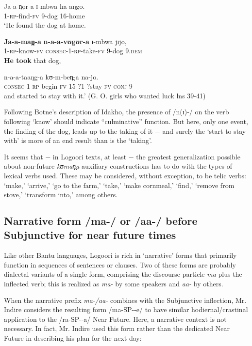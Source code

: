 \documentclass[output=paper]{langsci/langscibook}
\begin{document}
\ea\label{ex:sarvasy:27}
\gll Ja-a-n̪or-a   ɪ-mbwa   ha-aŋgo. \\
1-\textsc{rp}-find-\textsc{fv}  9-dog    16-home \\
\glt ‘He found the dog at home.

\gll \textbf{Ja-a-man̪-a}   \textbf{n-a-a-vʊgʊr-a}     ɪ-mbwa   jɪjo, \\
1-\textsc{rp}-know-\textsc{fv}  \textsc{consec}-1-\textsc{rp}-take-\textsc{fv}  9-dog    9.\textsc{dem} \\
\glt \textbf{He took} that dog,

\gll n-a-a-taaŋg-a       kʊ-m-ben̪-a     na-jo. \\
\textsc{consec}-1-\textsc{rp}-begin-\textsc{fv}  15-?1-?stay-\textsc{fv}  \textsc{conj}-9 \\
\glt and started to stay with it.’ (G. O. girls who wanted luck lns 39-41)
\z 

Following Botne’s description of Idakho, the presence of /n(ɪ)-/ on the verb following ‘know’ should indicate “culminative” function. But here, only one event, the finding of the dog, leads up to the taking of it $-$ and surely the ‘start to stay with’ is more of an end result than is the ‘taking’.

It seems that $-$ in Logoori texts, at least $-$ the greatest generalization possible about non-future \textit{kʊman̪a} auxiliary constructions has to do with the types of lexical verbs used. These may be considered, without exception, to be telic verbs: ‘make,’ ‘arrive,’ ‘go to the farm,’ ‘take,’ ‘make cornmeal,’ ‘find,’ ‘remove from stove,’ ‘transform into,’ among others.

\subsection{Narrative form /ma-/ or /aa-/ before Subjunctive for near future times} \label{sec:sarvasy:7.4}

Like other Bantu languages, Logoori is rich in ‘narrative’ %
%
forms that primarily function in sequences of sentences or clauses. Two of these forms are probably dialectal variants of a single form, comprising the discourse particle \textit{ma} plus the inflected verb; this is realized as \textit{ma-} by some speakers and \textit{aa-} by others.

When the narrative prefix \textit{ma-/aa-} combines with the Subjunctive inflection, Mr. Indire considers the resulting form /ma-SP-{\longrule}-e/ to have similar hodiernal/crastinal application to the /ra-SP-{\longrule}-a/ Near Future. Here, a narrative context is not necessary. In fact, Mr. Indire used this form rather than the dedicated Near Future in describing his plan for the next day:
\end{document}
